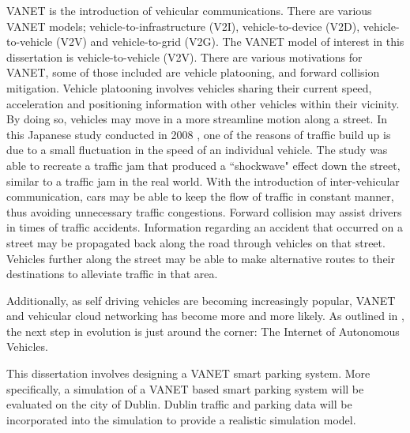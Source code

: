 \ac{VANET} is the introduction of vehicular communications. There are various \ac{VANET} models; vehicle-to-infrastructure (V2I), vehicle-to-device (V2D), vehicle-to-vehicle (V2V) and vehicle-to-grid (V2G). The \ac{VANET} model of interest in this dissertation is vehicle-to-vehicle (V2V). There are various motivations for \ac{VANET}, some of those included are vehicle platooning, and forward collision mitigation. Vehicle platooning involves vehicles sharing their current speed, acceleration and positioning information with other vehicles within their vicinity. By doing so, vehicles may move in a more streamline motion along a street. In this Japanese study conducted in 2008 \citep{Sugiyamal2008TrafficJam}, one of the reasons of traffic build up is due to a small fluctuation in the speed of an individual vehicle. The study was able to recreate a traffic jam that produced a ``shockwave" effect down the street, similar to a traffic jam in the real world. With the introduction of inter-vehicular communication, cars may be able to keep the flow of traffic in constant manner, thus avoiding unnecessary traffic congestions. Forward collision may assist drivers in times of traffic accidents. Information regarding an accident that occurred on a street may be propagated back along the road through vehicles on that street. Vehicles further along the street may be able to make alternative routes to their destinations to alleviate traffic in that area.

Additionally, as self driving vehicles are becoming increasingly popular, \ac{VANET} and vehicular cloud networking has become more and more likely. As outlined in \citep{Gerla2014InternetClouds}, the next step in evolution is just around the corner: The Internet of Autonomous Vehicles.

This dissertation involves designing a \ac{VANET} smart parking system. More specifically, a simulation of a \ac{VANET} based smart parking system will be evaluated on the city of Dublin. Dublin traffic and parking data will be incorporated into the simulation to provide a realistic simulation model.